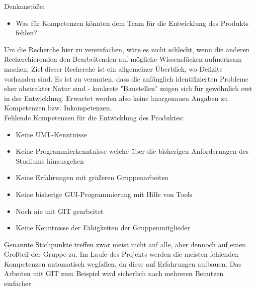 Denkanstöße:
\begin{itemize}
\item Was für Kompetenzen könnten dem Team für die Entwicklung des Produkts fehlen?
\end{itemize}
Um die Recherche hier zu vereinfachen, wäre es nicht schlecht, wenn die anderen Recherchierenden den Bearbeitenden auf mögliche Wissenslücken aufmerksam machen. Ziel dieser Recherche ist ein allgemeiner Überblick, wo Defizite vorhanden sind. Es ist zu vermuten, dass die anfänglich identifizierten Probleme eher abstrakter Natur sind - konkrete "Baustellen" zeigen sich für gewöhnlich erst in der Entwicklung. Erwartet werden also keine haargenauen Angaben zu Kompetenzen bzw. Inkompetenzen.
\\
Fehlende Kompetenzen für die Entwicklung des Produktes:
\begin{itemize}
\item Keine UML-Kenntnisse
\item Keine Programmierkenntnisse welche über die bisherigen Anforderungen des Studiums hinausgehen
\item Keine Erfahrungen mit größeren Gruppenarbeiten
\item Keine bisherige GUI-Programmierung mit Hilfe von Tools
\item Noch nie mit GIT gearbeitet
\item Keine Kenntnisse der Fähigkeiten der Gruppenmitglieder
\end{itemize}

Genannte Stichpunkte treffen zwar meist nicht auf alle, aber dennoch auf einen Großteil der Gruppe zu.
Im Laufe des Projekts werden die meisten fehlenden Kompetenzen automatisch wegfallen, da diese auf Erfahrungen aufbauen. Das Arbeiten mit GIT zum Beispiel wird sicherlich nach mehreren Benutzen einfacher.
\nsecend
